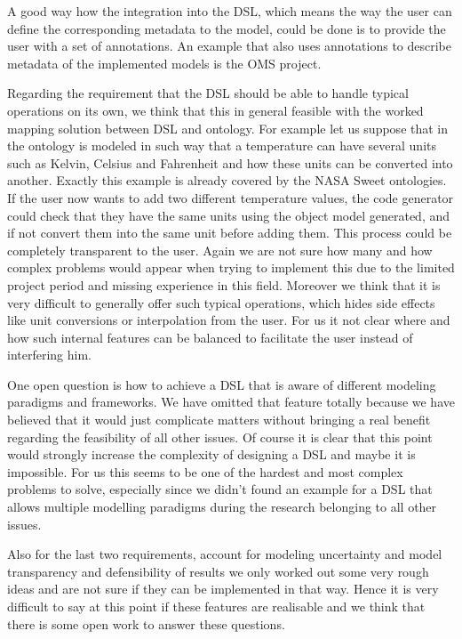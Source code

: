 A good way how the integration into the DSL, which means the way the user can define the corresponding metadata to the model, could be done is to provide the user with a set of annotations. An example that also uses annotations to describe metadata of the implemented models is the OMS project.
\par
Regarding the requirement that the DSL should be able to handle typical operations on its own, we think that this in general feasible with the worked mapping solution between DSL and ontology. For example let us suppose that in the ontology is modeled in such way that a temperature can have several units such as Kelvin, Celsius and Fahrenheit and how these units can be converted into another. Exactly this example is already covered by the NASA Sweet ontologies. If the user now wants to add two different temperature values, the code generator could check that they have the same units using the object model generated, and if not convert them into the same unit before adding them. This process could be completely transparent to the user. Again we are not sure how many and how complex problems would appear when trying to implement this due to the limited project period and missing experience in this field. Moreover we think that it is very difficult to generally offer such typical operations, which hides side effects like unit conversions or interpolation from the user. For us it not clear where and how such internal features can be balanced to facilitate the user instead of interfering him.
\par
One open question is how to achieve a DSL that is aware of different modeling paradigms and frameworks. We have omitted that feature totally because we have believed that it would just complicate matters without bringing a real benefit regarding the feasibility of all other issues. Of course it is clear that this point would strongly increase the complexity of designing a DSL and maybe it is impossible. For us this seems to be one of the hardest and most complex problems to solve, especially since we didn’t found an example for a DSL that allows multiple modelling paradigms during the research belonging to all other issues.
\par
Also for the last two requirements, account for modeling uncertainty and model transparency and defensibility of results we only worked out some very rough ideas and are not sure if they can be implemented in that way. Hence it is very difficult to say at this point if these features are realisable and we think that there is some open work to answer these questions.
